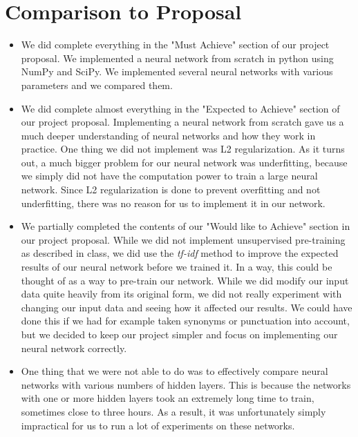 \documentclass[11pt,letterpaper]{article}
\begin{document}
\section{Comparison to Proposal}

\begin{itemize}
    \item We did complete everything in the "Must Achieve" section of our project proposal. We implemented a neural network from scratch in python using NumPy and SciPy. We implemented several neural networks with various parameters and we compared them.

    \item We did complete almost everything in the "Expected to Achieve" section of our project proposal. Implementing a neural network from scratch gave us a much deeper understanding of neural networks and how they work in practice. One thing we did not implement was L2 regularization. As it turns out, a much bigger problem for our neural network was underfitting, because we simply did not have the computation power to train a large neural network. Since L2 regularization is done to prevent overfitting and not underfitting, there was no reason for us to implement it in our network.

    \item We partially completed the contents of our "Would like to Achieve" section in our project proposal. While we did not implement unsupervised pre-training as described in class, we did use the \emph{tf-idf} method to improve the expected results of our neural network before we trained it. In a way, this could be thought of as a way to pre-train our network. While we did modify our input data quite heavily from its original form, we did not really experiment with changing our input data and seeing how it affected our results. We could have done this if we had for example taken synonyms or punctuation into account, but we decided to keep our project simpler and focus on implementing our neural network correctly.

    \item One thing that we were not able to do was to effectively compare neural networks with various numbers of hidden layers. This is because the networks with one or more hidden layers took an extremely long time to train, sometimes close to three hours. As a result, it was unfortunately simply impractical for us to run a lot of experiments on these networks.
\end{itemize}
\end{document}
